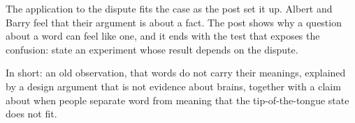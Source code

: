 \begin{afterword}
The application to the dispute fits the case as the post set it up. Albert and Barry feel that their argument is about a fact. The post shows why a question about a word can feel like one, and it ends with the test that exposes the confusion: state an experiment whose result depends on the dispute.

In short: an old observation, that words do not carry their meanings, explained by a design argument that is not evidence about brains, together with a claim about when people separate word from meaning that the tip-of-the-tongue state does not fit.
\end{afterword}
